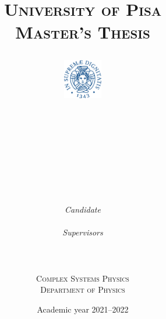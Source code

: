 \title{
  \textsc{University of Pisa}\\
  \textsc{Master's Thesis}\\

  \begin{figure}[h]
    \centering
    \includegraphics[width=0.15\textwidth]{figures/unipi_logo.pdf}
  \end{figure}


  \hrulefill \\
  \vspace{8pt}
  \Huge \textbf{\Title} \\
  \hrulefill \\
  \vspace{20pt}
}


\author{
  \begin{minipage}[h]{0.45\linewidth}
    \begin{flushleft}
      \textit{Candidate} \\
      \textbf{\Luca}
    \end{flushleft}
  \end{minipage}
  \begin{minipage}[h]{0.45\linewidth}
    \begin{flushright}
      \textit{Supervisors} \\
      \textbf{\Florent} \\
      \textbf{\Bruno}
    \end{flushright}
  \end{minipage}
  \hspace{50pt}
  \vspace{30pt} \\
  \textsc{Complex Systems Physics}\\
  \textsc{Department of Physics}
}
\date{Academic year 2021--2022}
  
